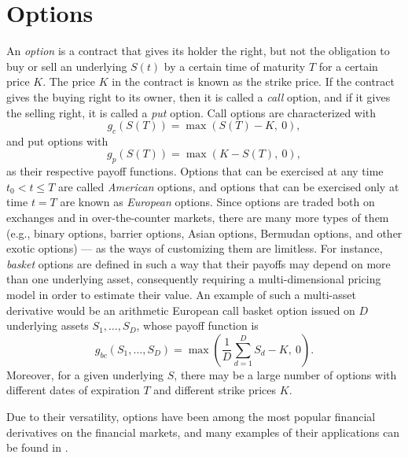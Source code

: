 \documentclass{UUThesisTemplate}
\begin{document}
\section{Options}
\label{sec:options}
\par An \emph{option} is a contract that gives its holder the right, but not the obligation to buy or sell an underlying $S(t)$ by a certain time of maturity $T$ for a certain price $K$. The price $K$ in the contract is known as the strike price. If the contract gives the buying right to its owner, then it is called a \emph{call} option, and if it gives the selling right, it is called a \emph{put} option. Call options are characterized with 
$$g_c(S(T))=\max(S(T)-K,\ 0),$$
and put options with 
$$g_p(S(T))=\max(K-S(T),\ 0),$$
as their respective payoff functions. Options that can be exercised at any time $t_0 < t \leq T$ are called \emph{American} options, and options that can be exercised only at time $t=T$ are known as \emph{European} options. Since options are traded both on exchanges and in over-the-counter markets, there are many more types of them (e.g., binary options, barrier options, Asian options, Bermudan options, and other exotic options) --- as the ways of customizing them are limitless. For instance, \emph{basket} options are defined in such a way that their payoffs may depend on more than one underlying asset, consequently requiring a multi-dimensional pricing model in order to estimate their value. An example of such a multi-asset derivative would be an arithmetic European call basket option issued on $D$ underlying assets $S_1,\ldots,S_D$, whose payoff function is 
$$g_{bc}(S_1,\ldots,S_D) = \max\left(\frac{1}{D}\sum_{d=1}^D S_d - K,\ 0\right).$$
Moreover, for a given underlying $S$, there may be a large number of options with different dates of expiration $T$ and different strike prices $K$.
\par Due to their versatility, options have been among the most popular financial derivatives on the financial markets, and many examples of their applications can be found in \cite{hull2017options}.
%
%
\end{document}
